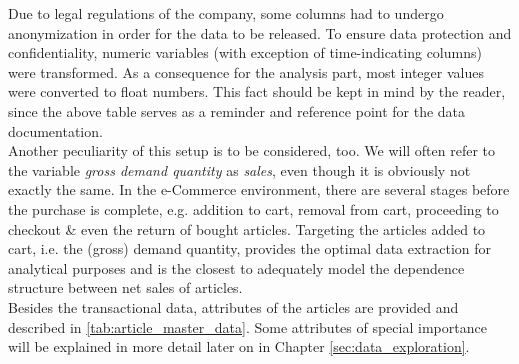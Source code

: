 Due to legal regulations of the company, some columns had to undergo anonymization in order for the data to be released. To ensure data protection and confidentiality, numeric variables (with exception of time-indicating columns) were transformed. As a consequence for the analysis part, most integer values were converted to float numbers. This fact should be kept in mind by the reader, since the above table serves as a reminder and reference point for the data documentation.\\

Another peculiarity of this setup is to be considered, too. We will often refer to the variable \textit{gross demand quantity} as \textit{sales}, even though it is obviously not exactly the same. In the e-Commerce environment, there are several stages before the purchase is complete, e.g. addition to cart, removal from cart, proceeding to checkout \& even the return of bought articles. Targeting the articles added to cart, i.e. the (gross) demand quantity, provides the optimal data extraction for analytical purposes and is the closest to adequately model the dependence structure between net sales of articles.\\

Besides the transactional data, attributes of the articles are provided and described in \autoref{tab:article_master_data}. Some attributes of special importance will be explained in more detail later on in Chapter \ref{sec:data_exploration}. 

